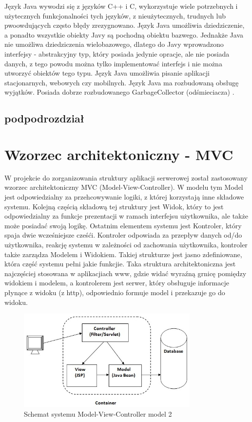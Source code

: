 \documentclass[eng,printmode,oneside]{mgr}
\begin{document}
Język Java wywodzi się z języków C++ i C, wykorzystuje wiele potrzebnych i
użytecznych funkcjonalności tych języków, z nieużytecznych, trudnych lub
pwoowdujących często błędy zrezygnowano. Język Java umożliwia dziedziczenie, a
ponadto wszystkie obiekty Javy są pochodną obiektu bazwego. Jednakże Java nie
umożliwa dziedziczenia wielobazowego, dlatego do Javy wprowadzono interfejsy -
abstrakcyjny typ, który posiada jedynie opracje, ale nie posiada danych, z tego
powodu można tylko implementować interfejs i nie można utworzyć obiektów tego
typu. Język Java umożliwia pisanie aplikacji stacjonarnych, webowych czy
mobilnych. Język Java ma rozbudowaną obsługę wyjątków. Posiada dobrze
rozbudowanego GarbageCollector (odśmieciacza) \cite{java.doc}.
\subsection{podpodrozdział}

\section{Wzorzec architektoniczny - MVC}

W projekcie do zorganizowania struktury aplikacji serwerowej został zastosowany
wzorzec architektoniczny MVC (Model-View-Controller). W modelu tym Model jest
odpowiedzialny za przehcowywanie logiki, z której korzystają inne składowe
systemu. Kolejną częścią składową tej struktury jest Widok, który to jest
odpowiedzialny za funkcje prezentacji w ramach interfejsu użytkownika, ale
także może posiadać swoją logikę. Ostatnim elementem systemu jest Kontroler,
który spaja dwie wcześniejsze cześći. Kontroler odpowiada za przepływ danych
od/do użytkownika, reakcję systemu w zależności od zachowania użytkownika,
kontroler także zarządza Modelem i Widokiem. Takiej strukturze jest jasno
zdefiniowane, która część systemu pełni jakie funkcjie. Taka struktura
architektoniczna jest najczęściej stosowana w aplikacjiach www, gdzie widać
wyraźną grnicę pomiędzy widokiem i modelem, a kontrolerem jest serwer, który
obsługuje informacje płynące z widoku (z http), odpowiednio formuje model i
przekazuje go do widoku. \cite{java.mvc}

\begin{figure}[ht!]
\centering
\includegraphics[width=90mm]{model2.jpg}
\caption{Schemat systemu Model-View-Controller model 2\cite{java.mvc.grafika}}
\label{MVC2}
\end{figure}
\end{document}
